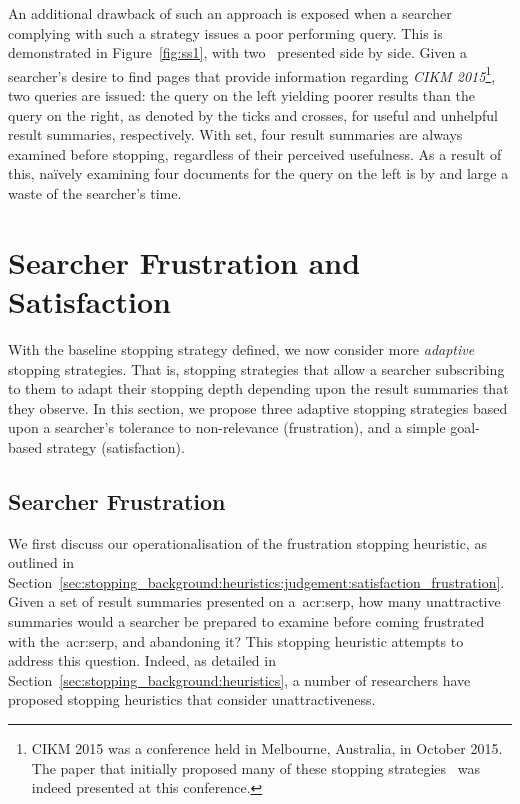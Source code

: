 An additional drawback of such an approach is exposed when a searcher complying with such a strategy issues a poor performing query. This is demonstrated in Figure~\ref{fig:ss1}, with two~ presented side by side. Given a searcher's desire to find pages that provide information regarding \emph{CIKM 2015}\footnote{CIKM 2015 was a conference held in Melbourne, Australia, in October 2015. The paper that initially proposed many of these stopping strategies~\cite{maxwell2015stopping_strategies} was indeed presented at this conference.}, two queries are issued: the query on the left yielding poorer results than the query on the right, as denoted by the ticks and crosses, for useful and unhelpful result summaries, respectively. With  set, four result summaries are always examined before stopping, regardless of their perceived usefulness. As a result of this, na\"{i}vely examining four documents for the query on the left is by and large a waste of the searcher's time.

\section{Searcher Frustration and Satisfaction}
With the baseline stopping strategy defined, we now consider more \emph{adaptive} stopping strategies. That is, stopping strategies that allow a searcher subscribing to them to adapt their stopping depth depending upon the result summaries that they observe. In this section, we propose three adaptive stopping strategies based upon a searcher's tolerance to non-relevance (frustration), and a simple goal-based strategy (satisfaction).

\subsection{Searcher Frustration}\label{sec:strategies:frustsat:frustration}
We first discuss our operationalisation of the frustration stopping heuristic, as outlined in Section~\ref{sec:stopping_background:heuristics:judgement:satisfaction_frustration}. Given a set of result summaries presented on a~\gls{acr:serp}, how many unattractive summaries would a searcher be prepared to examine before coming frustrated with the~\gls{acr:serp}, and abandoning it? This stopping heuristic attempts to address this question. Indeed, as detailed in Section~\ref{sec:stopping_background:heuristics}, a number of researchers have proposed stopping heuristics that consider unattractiveness.


